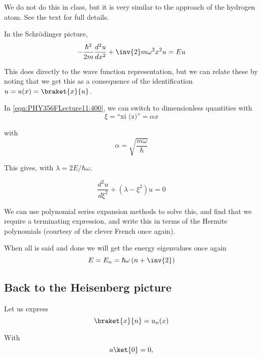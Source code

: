 We do not do this in class, but it is very similar to the approach of the hydrogen atom.  See the text for full details.

In the Schr\"{o}dinger picture,
\begin{equation}\label{eqn:PHY356FLecture11:400}
-\frac{\hbar^2}{2m} \frac{d^2 u}{dx^2} + \inv{2} m \omega^2 x^2 u = E u
\end{equation}

This does directly to the wave function representation, but we can relate these by noting that we get this as a consequence of the identification $u = u(x) = \braket{x}{u}$.

In \ref{eqn:PHY356FLecture11:400}, we can switch to dimensionless quantities with
\begin{equation}\label{eqn:PHY356FLecture11:410}
\xi = \text{``xi (z)''} = \alpha x
\end{equation}

with
\begin{equation}\label{eqn:PHY356FLecture11:411}
\alpha = \sqrt{\frac{m \omega}{\hbar}}
\end{equation}

This gives, with $\lambda = 2E/\hbar\omega$,

\begin{equation}\label{eqn:PHY356FLecture11:420}
\frac{d^2 u}{d\xi^2} + (\lambda - \xi^2) u = 0
\end{equation}

We can use polynomial series expansion methods to solve this, and find that we require a terminating expression, and write this in terms of the Hermite polynomials (courtesy of the clever French once again).

When all is said and done we will get the energy eigenvalues once again
\begin{equation}\label{eqn:PHY356FLecture11:430}
E = E_n = \hbar \omega \left( n + \inv{2} \right)
\end{equation}

\subsection{Back to the Heisenberg picture}

Let us express
\begin{equation}\label{eqn:PHY356FLecture11:500}
\braket{x}{n} = u_n(x)
\end{equation}

With
\begin{equation}\label{eqn:PHY356FLecture11:510}
a \ket{0} = 0,
\end{equation}

